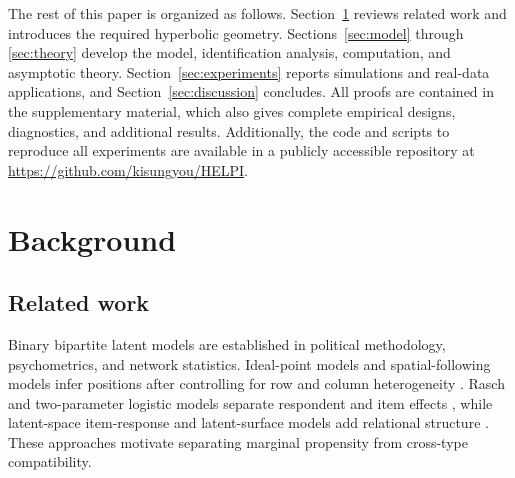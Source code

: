 \documentclass[
  12pt]{article}
\theoremstyle{definition}
\theoremstyle{plain}
\begin{document}
The rest of this paper is organized as follows. Section~\ref{sec:background} reviews related work and introduces the required hyperbolic geometry. Sections~\ref{sec:model} through \ref{sec:theory} develop the model, identification analysis, computation, and asymptotic theory. Section~\ref{sec:experiments} reports simulations and real-data applications, and Section~\ref{sec:discussion} concludes. All proofs are contained in the supplementary material, which also gives complete empirical designs, diagnostics, and additional results. Additionally, the code and scripts to reproduce all experiments are available in a publicly accessible repository at \url{https://github.com/kisungyou/HELPI}.

\section{Background}\label{sec:background}

\subsection{Related work}\label{sec:related}

Binary bipartite latent models are established in political methodology, psychometrics, and network statistics. Ideal-point models and spatial-following models infer positions after controlling for row and column heterogeneity \citep{clinton_2004_StatisticalAnalysisRoll,barbera_2015_BirdsSameFeather}. Rasch and two-parameter logistic models separate respondent and item effects \citep{birnbaum_1968_LatentTraitModels,rasch_1980_ProbabilisticModelsIntelligence}, while latent-space item-response and latent-surface models add relational structure \citep{mccormick_2015_LatentSurfaceModels,jeon_2021_MappingUnobservedItem}. These approaches motivate separating marginal propensity from cross-type compatibility.
\end{document}
